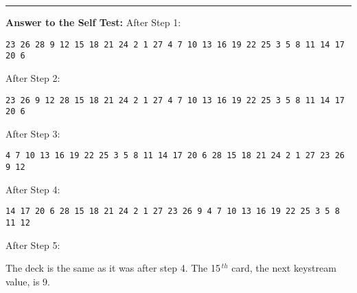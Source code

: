 \documentclass[]{article}
\begin{document}
\rule{16.5cm}{0.2pt}

\textbf{Answer to the Self Test: }
After Step 1:

\begin{verbatim}
23 26 28 9 12 15 18 21 24 2 1 27 4 7 10 13 16 19 22 25 3 5 8 11 14 17 20 6
\end{verbatim}

After Step 2:

\begin{verbatim}
23 26 9 12 28 15 18 21 24 2 1 27 4 7 10 13 16 19 22 25 3 5 8 11 14 17 20 6
\end{verbatim}

After Step 3:

\begin{verbatim}
4 7 10 13 16 19 22 25 3 5 8 11 14 17 20 6 28 15 18 21 24 2 1 27 23 26 9 12
\end{verbatim}

After Step 4:

\begin{verbatim}
14 17 20 6 28 15 18 21 24 2 1 27 23 26 9 4 7 10 13 16 19 22 25 3 5 8 11 12
\end{verbatim}

After Step 5:

The deck is the same as it was after step 4.  The 15$^{\, th}$ card, 
the next keystream value, is 9.
\end{document}
